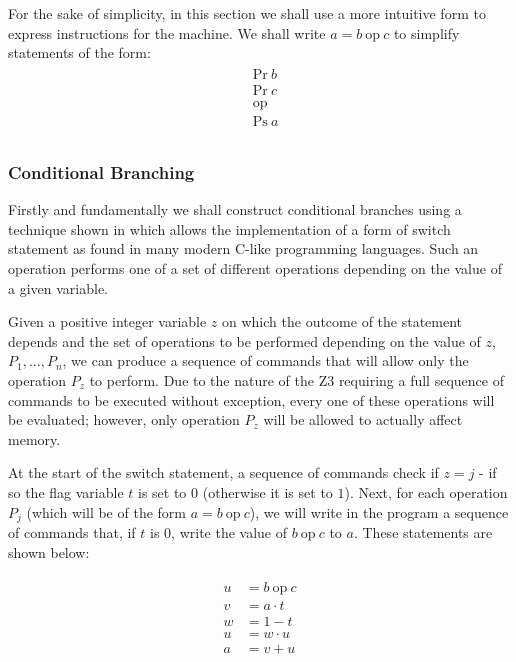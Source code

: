 \documentclass[Master.tex]{subfiles}
\begin{document}
For the sake of simplicity, in this section we shall use a more intuitive form to express instructions for the machine. We shall write $a = b\ \mathrm{op}\ c$ to simplify statements of the form:
\begin{gather*}
\begin{aligned}
&\mathrm{Pr}\ b\\
&\mathrm{Pr}\ c\\
&\textrm{op}\\ 
&\mathrm{Ps}\ a\\
\end{aligned}
\end{gather*}

\subsubsection{Conditional Branching}

Firstly and fundamentally we shall construct conditional branches using a technique shown in \cite{ibarra1983control} which allows the implementation of a form of switch statement as found in many modern C-like programming languages. Such an operation performs one of a set of different operations depending on the value of a given variable.

Given a positive integer variable $z$ on which the outcome of the statement depends and the set of operations to be performed depending on the value of $z$, $P_1, ... , P_n$, we can produce a sequence of commands that will allow only the operation $P_z$ to perform. Due to the nature of the Z3 requiring a full sequence of commands to be executed without exception, every one of these operations will be evaluated; however, only operation $P_z$ will be allowed to actually affect memory.


At the start of the switch statement, a sequence of commands check if $z = j$ - if so the flag variable $t$ is set to $0$ (otherwise it is set to $1$). Next, for each operation $P_j$ (which will be of the form $a = b\ \mathrm{op}\ c$), we will write in the program a sequence of commands that, if $t$ is $0$, write the value of $b\ \mathrm{op}\ c$ to $a$. These statements are shown below:

\begin{gather*}
\begin{aligned}
u &= b\ \mathrm{op}\ c \\
v &= a \cdot t \\
w &= 1 - t \\
u &= w \cdot u \\
a &= v + u
\end{aligned}
\end{gather*}
\end{document}

